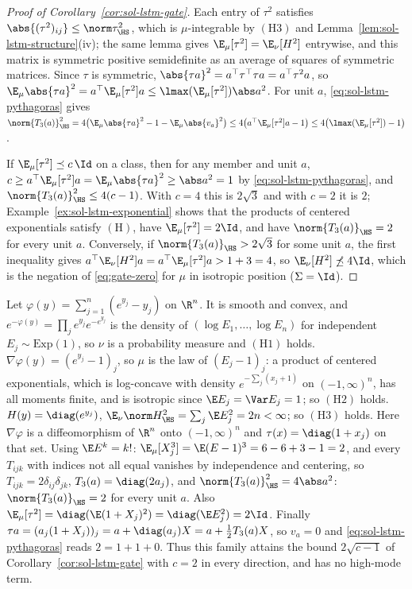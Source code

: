 \documentclass[../main.tex]{subfiles}
\begin{document}
\begin{proof}[Proof of Corollary~\ref{cor:sol-lstm-gate}]
Each entry of $\tau^2$ satisfies $\abs{(\tau^2)_{ij}}\le\norm\tau_{\HS}^2$, which is
$\mu$-integrable by $(\mathrm H3)$ and Lemma~\ref{lem:sol-lstm-structure}(iv); the same
lemma gives $\E_\mu[\tau^2]=\E_\nu[H^2]$ entrywise, and this matrix is symmetric positive
semidefinite as an average of squares of symmetric matrices.  Since $\tau$ is symmetric,
$\abs{\tau a}^2=a^\top\tau^\top\tau a=a^\top\tau^2a$, so $\E_\mu\abs{\tau a}^2=a^\top\E_\mu[\tau^2]a\le\lmax(\E_\mu[\tau^2])\abs a^2$.
For unit $a$, \eqref{eq:sol-lstm-pythagoras} gives
$\norm{T_3(a)}_{\HS}^2=4\bigl(\E_\mu\abs{\tau a}^2-1-\E_\mu\abs{v_a}^2\bigr)\le4\bigl(a^\top\E_\mu[\tau^2]a-1\bigr)\le4\bigl(\lmax(\E_\mu[\tau^2])-1\bigr)$.

If $\E_\mu[\tau^2]\preceq c\,\Id$ on a class, then for any member and unit $a$,
$c\ge a^\top\E_\mu[\tau^2]a=\E_\mu\abs{\tau a}^2\ge\abs a^2=1$ by
\eqref{eq:sol-lstm-pythagoras}, and $\norm{T_3(a)}_{\HS}^2\le4(c-1)$.  With $c=4$ this is
$2\sqrt3$ and with $c=2$ it is $2$; Example~\ref{ex:sol-lstm-exponential} shows that the
products of centered exponentials satisfy $(\mathrm H)$, have $\E_\mu[\tau^2]=2\Id$, and have
$\norm{T_3(a)}_{\HS}=2$ for every unit $a$.  Conversely, if $\norm{T_3(a)}_{\HS}>2\sqrt3$ for
some unit $a$, the first inequality gives $a^\top\E_\nu[H^2]a=a^\top\E_\mu[\tau^2]a>1+3=4$,
so $\E_\nu[H^2]\not\preceq4\Id$, which is the negation of \eqref{eq:gate-zero} for $\mu$ in
isotropic position ($\Sigma=\Id$).
\end{proof}

\begin{example}
\label{ex:sol-lstm-exponential}
Let $\varphi(y)=\sum_{j=1}^n(e^{y_j}-y_j)$ on $\R^n$.  It is smooth and convex, and
$e^{-\varphi(y)}=\prod_je^{y_j}e^{-e^{y_j}}$ is the density of $(\log E_1,\dots,\log E_n)$
for independent $E_j\sim\mathrm{Exp}(1)$, so $\nu$ is a probability measure and $(\mathrm H1)$
holds.  $\nabla\varphi(y)=(e^{y_j}-1)_j$, so $\mu$ is the law of $(E_j-1)_j$: a product of
centered exponentials, which is log-concave with density $e^{-\sum_j(x_j+1)}$ on
$(-1,\infty)^n$, has all moments finite, and is isotropic since $\E E_j=\Var E_j=1$; so
$(\mathrm H2)$ holds.  $H(y)=\diag(e^{y_j})$, $\E_\nu\norm H_{\HS}^2=\sum_j\E E_j^2=2n<\infty$;
so $(\mathrm H3)$ holds.  Here $\nabla\varphi$ is a diffeomorphism of $\R^n$ onto
$(-1,\infty)^n$ and $\tau(x)=\diag(1+x_j)$ on that set.  Using
$\E E^k=k!$: $\E_\mu[X_j^3]=\E(E-1)^3=6-6+3-1=2$, and every $T_{ijk}$ with indices not all
equal vanishes by independence and centering, so $T_{ijk}=2\delta_{ij}\delta_{jk}$,
$T_3(a)=\diag(2a_j)$, and $\norm{T_3(a)}_{\HS}^2=4\abs a^2$: $\norm{T_3(a)}_{\HS}=2$ for
every unit $a$.  Also $\E_\mu[\tau^2]=\diag(\E(1+X_j)^2)=\diag(\E E_j^2)=2\Id$.  Finally
$\tau a=(a_j(1+X_j))_j=a+\diag(a_j)X=a+\tfrac12T_3(a)X$, so $v_a=0$ and
\eqref{eq:sol-lstm-pythagoras} reads $2=1+1+0$.  Thus this family attains the bound
$2\sqrt{c-1}$ of Corollary~\ref{cor:sol-lstm-gate} with $c=2$ in every direction, and has no
high-mode term.
\end{example}
\end{document}
